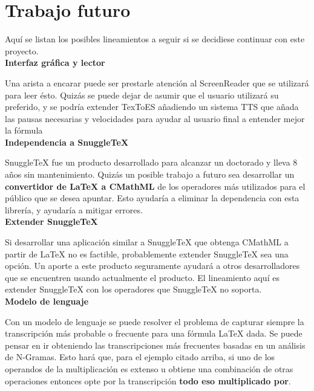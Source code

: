 \section{Trabajo futuro}

Aquí se listan los posibles lineamientos a seguir si se decidiese continuar con este proyecto.\\

{\Large \textbf{Interfaz gráfica y lector}}

Una arista a encarar puede ser prestarle atención al ScreenReader que se utilizará para leer ésto. Quizás se puede dejar de asumir que el usuario utilizará su preferido, y se podría extender TexToES añadiendo un sistema TTS que añada las pausas necesarias y velocidades para ayudar al usuario final a entender mejor la fórmula\\

{\Large \textbf{Independencia a SnuggleTeX}}

SnuggleTeX fue un producto desarrollado para alcanzar un doctorado y lleva 8 años sin mantenimiento. Quizás un posible trabajo a futuro sea desarrollar un \textbf{convertidor de LaTeX a CMathML} de los operadores más utilizados para el público que se desea apuntar. Esto ayudaría a eliminar la dependencia con esta librería, y ayudaría a mitigar errores.\\

{\Large \textbf{Extender SnuggleTeX}}

Si desarrollar una aplicación similar a SnuggleTeX que obtenga CMathML a partir de LaTeX no es factible, probablemente extender SnuggleTeX sea una opción. Un aporte a este producto seguramente ayudará a otros desarrolladores que se encuentren usando actualmente el producto. El lineamiento aquí es extender SnuggleTeX con los operadores que SnuggleTeX no soporta.\\

{\Large\textbf{ Modelo de lenguaje}}

Con un modelo de lenguaje se puede resolver el problema de capturar siempre la transcripción más probable o frecuente para una fórmula LaTeX dada. Se puede pensar en ir obteniendo las transcripciones más frecuentes basadas en un análisis de N-Gramas. Esto hará que, para el ejemplo citado arriba, si uno de los operandos de la multiplicación es extenso u obtiene una combinación de otras operaciones entonces opte por la transcripción \textbf{todo eso multiplicado por}.